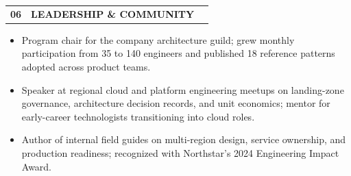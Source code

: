\documentclass[10pt,a4paper]{article}
\makeatletter
\newcommand{\resumeSection}[2]{%
  \Needspace*{5\baselineskip}%
  \vspace{5pt}%
  \noindent
  \begin{tabularx}{\linewidth}{@{}l@{\hspace{7pt}}l@{\hspace{8pt}}X@{}}
    {\small\bfseries\color{blue}#1} &
    {\large\bfseries\color{navy}#2} &
    \raisebox{0.45ex}{\color{line}\leaders\hrule height 0.7pt\hfill\kern0pt}
  \end{tabularx}%
  \par\vspace{3pt}
}
\makeatother
\begin{document}
\resumeSection{06}{LEADERSHIP \& COMMUNITY}
\begin{itemize}
  \item Program chair for the company architecture guild; grew monthly participation from 35 to 140 engineers and published 18 reference patterns adopted across product teams.
  \item Speaker at regional cloud and platform engineering meetups on landing-zone governance, architecture decision records, and unit economics; mentor for early-career technologists transitioning into cloud roles.
  \item Author of internal field guides on multi-region design, service ownership, and production readiness; recognized with Northstar's 2024 Engineering Impact Award.
\end{itemize}
\end{document}
